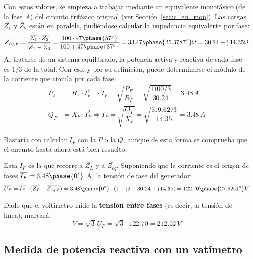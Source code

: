 \begin{example}
Con estos valores, se empieza a trabajar mediante un equivalente monofásico (de la fase $A$) del circuito trifásico original (ver Sección~\ref{sec:c_eq_mon}). Las cargas $\overline{Z_1}$ y $\overline{Z_2}$ están en paralelo, pudiéndose calcular la impedancia equivalente por fase:
\begin{equation*}
    \overline{Z_{eq,F}}=\dfrac{\overline{Z_1}\cdot\overline{Z_2}}{\overline{Z_1}+\overline{Z_2}}=\dfrac{100\cdot 47\phase{37^\circ}}{100+ 47\phase{37^\circ}}=33.47\phase{25.3787^\circ}\Omega=30.24+\mathrm{j}\,14.35\Omega
\end{equation*}
Al tratarse de un sistema equilibrado, la potencia activa y reactiva de cada fase es $1/3$ de la total. Con eso, y por su definición, puede determinarse el módulo de la corriente que circula por cada fase:
\begin{align*}
    P_F&=R_F\cdot I_F^2\Rightarrow I_F=\sqrt{\dfrac{P_F}{R_F}}=\sqrt{\dfrac{1100/3}{30.24}}=3.48\,A\\
    Q_F&=X_F\cdot I_F^2\Rightarrow I_F=\sqrt{\dfrac{Q_F}{X_F}}=\sqrt{\dfrac{519.62/3}{14.35}}=3.48\,A
\end{align*}
\begin{remark}
    Bastaría con calcular $I_F$ con la $P$ o la $Q$, aunque de esta forma se comprueba que el circuito hasta ahora está bien resuelto. 
\end{remark}
Esta $I_F$ es la que recorre a $\overline{Z_L}$ y a $\overline{Z_{eq}}$. Suponiendo que la corriente es el origen de fases $\overline{I_F}=3.48\phase{0^\circ}$ A, la tensión de fase del generador:
\begin{equation*}
    \overline{U_F}=\overline{I_F}\cdot (\overline{Z_L}+\overline{Z_{eq,F}})=3.48\phase{0^\circ}\cdot(1+\mathrm{j}2+30.24+\mathrm{j}\,14.35)=122.70\phase{27.6261^\circ} V
\end{equation*}

Dado que el voltímetro mide la \textbf{tensión entre fases} (es decir, la tensión de línea), marcará:
\begin{equation*}
    V=\sqrt{3}\,U_F=\sqrt{3}\cdot 122.70=212.52\,V
\end{equation*}
\end{example}


\subsection{Medida de potencia reactiva con un vatímetro}

